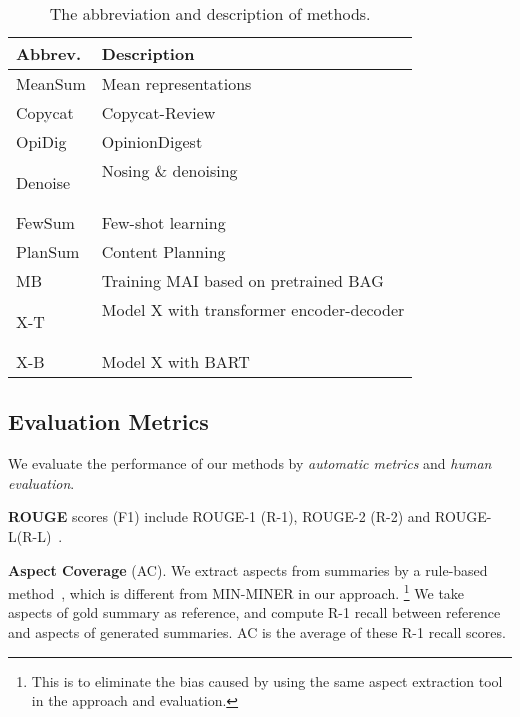 \begin{table}[th]
   \small
	\centering
	\begin{tabular}{|m{1.2cm}<{\raggedleft}|p{5.5cm}|}
		\hline
		\textbf{Abbrev.} & \textbf{Description} \\ 
	    \hline
         MeanSum &Mean representations~\cite{MeanSum19}  \\
        \hline
		Copycat & Copycat-Review~\cite{Copycat20}\\
		\hline
		OpiDig & OpinionDigest~\cite{OpiDig20}\\
		\hline
		Denoise & \tabincell{l}{Nosing \& denoising \\ ~\cite{Denoise20}} \\
		\hline
		FewSum & Few-shot learning~\cite{Fewshot20}\\
		\hline
		PlanSum & Content Planning~\cite{Plansum20}\\
		\hline
		MB & Training MAI based on pretrained BAG \\
		\hline
		X-T & \tabincell{l}{Model X with transformer encoder-decoder \\ ~\cite{Transformer17}} \\
		\hline
		X-B & Model X with BART~\cite{BART20} \\
		\hline
	\end{tabular}
	\caption{The abbreviation and description of methods.}
	\label{tab:baselines}
\end{table}


\subsection{Evaluation Metrics}
We evaluate the performance of our methods by {\em automatic metrics}
and {\em human evaluation}.


\textbf{ROUGE} scores (F1) include
ROUGE-1 (R-1), ROUGE-2 (R-2) and
ROUGE-L(R-L)~\cite{rouge}.

\textbf{Aspect Coverage} (AC).
We extract aspects from summaries 
by a rule-based method~\cite{aspect14},
which is different from MIN-MINER in our approach.
\footnote{This is to eliminate the bias caused by using the same aspect extraction tool in the approach and evaluation.}
We take aspects of gold summary as reference,
and compute R-1 recall between reference  
and aspects of generated summaries.
AC is the average of these R-1 recall scores.

